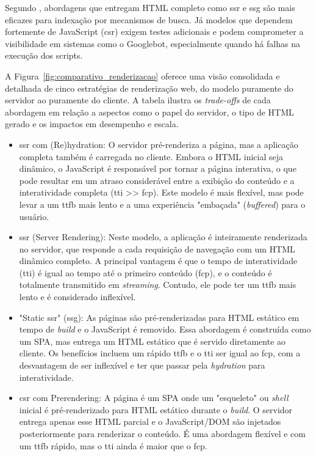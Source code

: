 Segundo , abordagens que entregam HTML completo como \acrshort{ssr} e \acrshort{ssg} são mais eficazes para indexação por mecanismos de busca. Já modelos que dependem fortemente de JavaScript (\acrshort{csr}) exigem testes adicionais e podem comprometer a visibilidade em sistemas como o Googlebot, especialmente quando há falhas na execução dos scripts.

A Figura~\ref{fig:comparativo_renderizacao} oferece uma visão consolidada e detalhada de cinco estratégias de renderização web, do modelo puramente do servidor ao puramente do cliente. A tabela ilustra os \textit{trade-offs} de cada abordagem em relação a aspectos como o papel do servidor, o tipo de HTML gerado e os impactos em desempenho e escala.

\begin{itemize}
    \item \acrshort{ssr} com (Re)hydration: O servidor pré-renderiza a página, mas a aplicação completa também é carregada no cliente. Embora o HTML inicial seja dinâmico, o JavaScript é responsável por tornar a página interativa, o que pode resultar em um atraso considerável entre a exibição do conteúdo e a interatividade completa (\acrshort{tti} >> \acrshort{fcp}). Este modelo é mais flexível, mas pode levar a um \acrshort{ttfb} mais lento e a uma experiência "embaçada" (\textit{buffered}) para o usuário.

    \item \acrshort{ssr} (Server Rendering): Neste modelo, a aplicação é inteiramente renderizada no servidor, que responde a cada requisição de navegação com um HTML dinâmico completo. A principal vantagem é que o tempo de interatividade (\acrshort{tti}) é igual ao tempo até o primeiro conteúdo (\acrshort{fcp}), e o conteúdo é totalmente transmitido em \textit{streaming}. Contudo, ele pode ter um \acrshort{ttfb} mais lento e é considerado inflexível.

    \item "Static \acrshort{ssr}" (\acrshort{ssg}): As páginas são pré-renderizadas para HTML estático em tempo de \textit{build} e o JavaScript é removido. Essa abordagem é construída como um SPA, mas entrega um HTML estático que é servido diretamente ao cliente. Os benefícios incluem um rápido \acrshort{ttfb} e o \acrshort{tti} ser igual ao \acrshort{fcp}, com a desvantagem de ser inflexível e ter que passar pela \textit{hydration} para interatividade.

    \item \acrshort{csr} com Prerendering: A página é um SPA onde um "esqueleto" ou \textit{shell} inicial é pré-renderizado para HTML estático durante o \textit{build}. O servidor entrega apenas esse HTML parcial e o JavaScript/DOM são injetados posteriormente para renderizar o conteúdo. É uma abordagem flexível e com um \acrshort{ttfb} rápido, mas o \acrshort{tti} ainda é maior que o \acrshort{fcp}.


\end{itemize}
